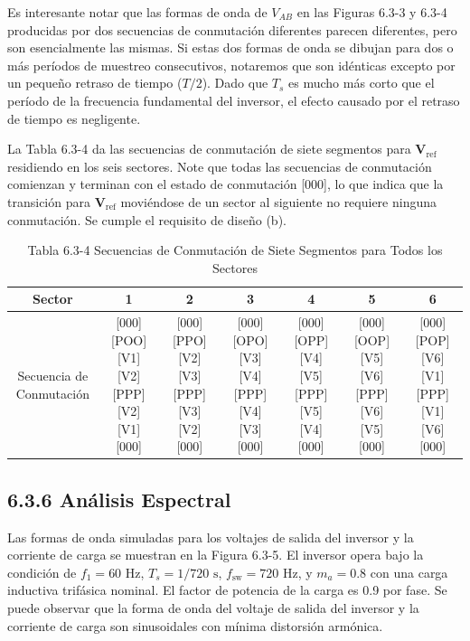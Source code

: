 \documentclass[letterpaper,12pt]{article}
\begin{document}
Es interesante notar que las formas de onda de \( V_{AB} \) en las Figuras 6.3-3 y 6.3-4 producidas por dos secuencias de conmutación diferentes parecen diferentes, pero son esencialmente las mismas. Si estas dos formas de onda se dibujan para dos o más períodos de muestreo consecutivos, notaremos que son idénticas excepto por un pequeño retraso de tiempo (\( T/2 \)). Dado que \( T_s \) es mucho más corto que el período de la frecuencia fundamental del inversor, el efecto causado por el retraso de tiempo es negligente.
    
La Tabla 6.3-4 da las secuencias de conmutación de siete segmentos para \( \mathbf{V}_{\text{ref}} \) residiendo en los seis sectores. Note que todas las secuencias de conmutación comienzan y terminan con el estado de conmutación [000], lo que indica que la transición para \( \mathbf{V}_{\text{ref}} \) moviéndose de un sector al siguiente no requiere ninguna conmutación. Se cumple el requisito de diseño (b).

\begin{table}[h]
\centering
\caption{Tabla 6.3-4 Secuencias de Conmutación de Siete Segmentos para Todos los Sectores}
\begin{tabular}{c c c c c c c}
\hline
Sector & 1 & 2 & 3 & 4 & 5 & 6 \\
\hline
Secuencia de Conmutación & [000] [POO] [V1] [V2] [PPP] [V2] [V1] [000] & [000] [PPO] [V2] [V3] [PPP] [V3] [V2] [000] & [000] [OPO] [V3] [V4] [PPP] [V4] [V3] [000] & [000] [OPP] [V4] [V5] [PPP] [V5] [V4] [000] & [000] [OOP] [V5] [V6] [PPP] [V6] [V5] [000] & [000] [POP] [V6] [V1] [PPP] [V1] [V6] [000] \\
\hline
\end{tabular}
\end{table}
\FloatBarrier

\subsection*{6.3.6 Análisis Espectral}
    
Las formas de onda simuladas para los voltajes de salida del inversor y la corriente de carga se muestran en la Figura 6.3-5. El inversor opera bajo la condición de \( f_1 = 60 \text{ Hz} \), \( T_s = 1/720 \text{ s} \), \( f_{\text{sw}} = 720 \text{ Hz} \), y \( m_a = 0.8 \) con una carga inductiva trifásica nominal. El factor de potencia de la carga es 0.9 por fase. Se puede observar que la forma de onda del voltaje de salida del inversor y la corriente de carga son sinusoidales con mínima distorsión armónica.
\end{document}
